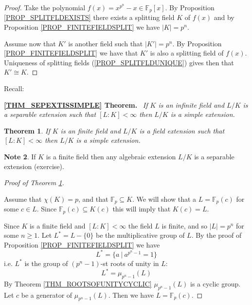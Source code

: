 \documentclass[12pt, letterpaper, oneside]{article}
\theoremstyle{plain}
\newtheorem{theorem}{Theorem}[section]
\theoremstyle{definition}
\newtheorem{note}[theorem]{Note}
\newcommand{\F}{{\mathbb F}}
\newcommand{\vs}{\vskip 5mm}
\begin{document}
\vs 

\begin{proof}
Take the polynomial $f(x) = x^{p^{n}} -x \in \F_{p}[x]$. By Proposition \ref{PROP_SPLITFLDEXISTS}
there exists a splitting field $K$ of $f(x)$ and by Proposition \ref{PROP_FINITEFIELDSPLIT} we have 
$|K|= p^{n}$. 

Assume now that $K'$ is another field such that $|K'| = p^{n}$. 
By Proposition  \ref{PROP_FINITEFIELDSPLIT} we have that $K'$ is also a splitting field of 
$f(x)$. Uniqueness of splitting fields (\ref{PROP_SPLITFLDUNIQUE}) gives then that 
$K'\cong K$. 
\end{proof}

\vs\vs\vs\vs\vs\vs

Recall:   

\textbf{\ref{THM_SEPEXTISSIMPLE} Theorem.} \ \emph{If $K$ is an infinite field and $L/K$ 
is a separable extension such that $[L:K] < \infty$ then $L/K$ is a simple extension.}

\vs\vs


\begin{theorem}
\label{THM_FINITEFLDSIMPLEEXT}
If $K$ is an finite field and $L/K$ is a field extension such that $[L:K] < \infty$ then 
$L/K$ is a simple extension.
\end{theorem}

\vs\vs

\begin{note}
If $K$ is a finite field then any algebraic extension $L/K$ is a separable extension
(exercise).
\end{note}

\vs\vs

\begin{proof}[Proof of Theorem \ref{THM_FINITEFLDSIMPLEEXT}] \ 

Assume that $\chi(K) = p$, and that $\F_{p}\subseteq K$. 
We will show that  a $L = \F_{p}(c)$ for some  $c\in L$. Since $\F_{p}(c) \subseteq K(c)$ 
this will imply that $K(c) = L$. 

Since $K$ is a finite field and $[L:K] < \infty$ the field $L$ is finite, and so $|L| = p^{n}$
for some $n\geq 1$.  Let $L^{\ast} = L - \{0\}$ be the multiplicative group of $L$.
By the proof of Proposition \ref{PROP_FINITEFIELDSPLIT} we have 
$$L^{\ast} = \{ a \ | \ a^{p^{n}-1} = 1\}$$
i.e. $L^{\ast}$ is the group of $(p^{n}-1)$-st roots of unity in $L$:
$$L^{\ast} = \mu_{p^{n}-1}(L)$$  
By Theorem \ref{THM_ROOTSOFUNITYCYCLIC} $\mu_{p^{n}-1}(L)$ is a cyclic group. 
Let $c$ be a generator of $\mu_{p^{n}-1}(L)$. Then we have  $L = \F_{p}(c)$.

\end{proof}
\end{document}
